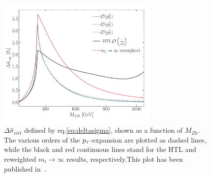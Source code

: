 \begin{figure}[th]
	\centering
	\includegraphics[width=0.7\textwidth]{./figures/sigma_part_virt_LMEreweighted.pdf}
	\caption{$\Delta \hat{\sigma}_{virt}$ defined by eq.\eqref{eq:deltasigma}, shown as a function of $M_{Zh}$. The various orders of the $p_{\scriptscriptstyle T}$-expansion are plotted as dashed lines, while the black and red continuous lines stand for the HTL and reweighted $m_t \rightarrow \infty$ results, respectively.This plot has been published in~\cite{Alasfar:2021ppe}.}
	\label{fig:deltasigma}
\end{figure}

